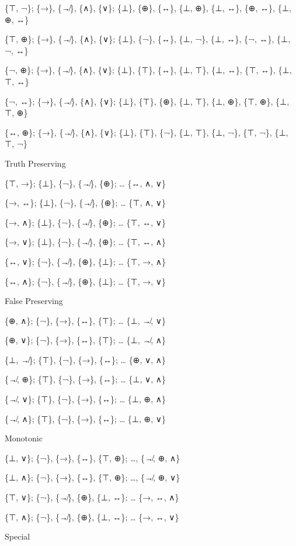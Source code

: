 \{⊤, ¬\}; \{→\}, \{↛\}, \{∧\}, \{∨\}; \{⊥\}, \{⊕\}, \{↔\}, \{⊥, ⊕\},
\{⊥, ↔\}, \{⊕, ↔\}, \{⊥, ⊕, ↔\}

\{⊤, ⊕\}; \{→\}, \{↛\}, \{∧\}, \{∨\}; \{⊥\}, \{¬\}, \{↔\}, \{⊥, ¬\},
\{⊥, ↔\}, \{¬, ↔\}, \{⊥, ¬, ↔\}

\{¬, ⊕\}; \{→\}, \{↛\}, \{∧\}, \{∨\}; \{⊥\}, \{⊤\}, \{↔\}, \{⊥, ⊤\},
\{⊥, ↔\}, \{⊤, ↔\}, \{⊥, ⊤, ↔\}

\{¬, ↔\}; \{→\}, \{↛\}, \{∧\}, \{∨\}; \{⊥\}, \{⊤\}, \{⊕\}, \{⊥, ⊤\},
\{⊥, ⊕\}, \{⊤, ⊕\}, \{⊥, ⊤, ⊕\}

\{↔, ⊕\}; \{→\}, \{↛\}, \{∧\}, \{∨\}; \{⊥\}, \{⊤\}, \{¬\}, \{⊥, ⊤\},
\{⊥, ¬\}, \{⊤, ¬\}, \{⊥, ⊤, ¬\}

\protect\hypertarget{anchor-10}{}{}Truth Preserving

\{⊤, →\}; \{⊥\}, \{¬\}, \{↛\}, \{⊕\}; \ldots{} \{↔, ∧, ∨\}

\{→, ↔\}; \{⊥\}, \{¬\}, \{↛\}, \{⊕\}; \ldots{} \{⊤, ∧, ∨\}

\{→, ∧\}; \{⊥\}, \{¬\}, \{↛\}, \{⊕\}; \ldots{} \{⊤, ↔, ∨\}

\{→, ∨\}; \{⊥\}, \{¬\}, \{↛\}, \{⊕\}; \ldots{} \{⊤, ↔, ∧\}

\{↔, ∨\}; \{¬\}, \{↛\}, \{⊕\}, \{⊥\}; \ldots{} \{⊤, →, ∧\}

\{↔, ∧\}; \{¬\}, \{↛\}, \{⊕\}, \{⊥\}; \ldots{} \{⊤, →, ∨\}

\protect\hypertarget{anchor-11}{}{}False Preserving

\{⊕, ∧\}; \{¬\}, \{→\}, \{↔\}, \{⊤\}; \ldots{} \{⊥, ↛, ∨\}

\{⊕, ∨\}; \{¬\}, \{→\}, \{↔\}, \{⊤\}; \ldots{} \{⊥, ↛, ∧\}

\{⊥, ↛\}; \{⊤\}, \{¬\}, \{→\}, \{↔\}; \ldots{} \{⊕, ∨, ∧\}

\{↛, ⊕\}; \{⊤\}, \{¬\}, \{→\}, \{↔\}; \ldots{} \{⊥, ∨, ∧\}

\{↛, ∨\}; \{⊤\}, \{¬\}, \{→\}, \{↔\}; \ldots{} \{⊥, ⊕, ∧\}

\{↛, ∧\}; \{⊤\}, \{¬\}, \{→\}, \{↔\}; \ldots{} \{⊥, ⊕, ∨\}

\protect\hypertarget{anchor-12}{}{}Monotonic

\{⊥, ∨\}; \{¬\}, \{→\}, \{↔\}, \{⊤, ⊕\}; \ldots, \{↛, ⊕, ∧\}

\{⊥, ∧\}; \{¬\}, \{→\}, \{↔\}, \{⊤, ⊕\}; \ldots, \{↛, ⊕, ∨\}

\{⊤, ∨\}; \{¬\}, \{↛\}, \{⊕\}, \{⊥, ↔\}; \ldots{} \{→, ↔, ∧\}

\{⊤, ∧\}; \{¬\}, \{↛\}, \{⊕\}, \{⊥, ↔\}; \ldots{} \{→, ↔, ∨\}

\protect\hypertarget{anchor-13}{}{}Special

